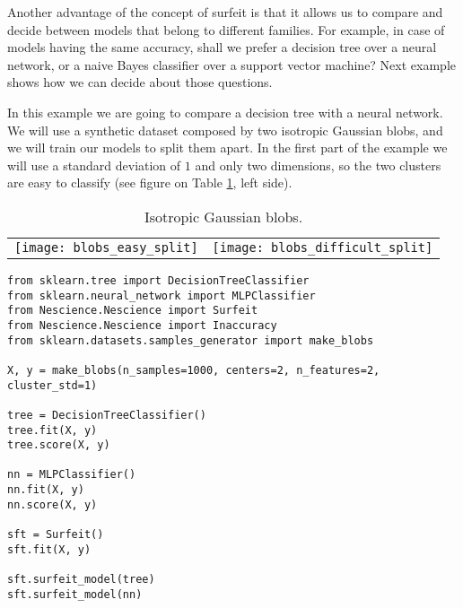 Another advantage of the concept of surfeit is that it allows us to compare and decide between models that belong to different families. For example, in case of models having the same accuracy, shall we prefer a decision tree over a neural network, or a naive Bayes classifier over a support vector machine? Next example shows how we can decide about those questions.

\begin{example}
\label{ex:dt_vs_nn}

In this example we are going to compare a decision tree with a neural network. We will use a synthetic dataset composed by two isotropic Gaussian blobs, and we will train our models to split them apart. In the first part of the example we will use a standard deviation of $1$ and only two dimensions, so the two clusters are easy to classify (see figure on Table \ref{tab:isotropic_gaussian_blobs}, left side).

\begin{table}
\begin{center}

\begin{tabular}{ c c }

\texttt{[image: blobs\_easy\_split]} & \texttt{[image: blobs\_difficult\_split]}

\end{tabular}
\end{center}
\caption{\label{tab:isotropic_gaussian_blobs}Isotropic Gaussian blobs.}
\end{table}


\begin{sourcecode}
{\scriptsize \begin{verbatim}
from sklearn.tree import DecisionTreeClassifier
from sklearn.neural_network import MLPClassifier
from Nescience.Nescience import Surfeit
from Nescience.Nescience import Inaccuracy
from sklearn.datasets.samples_generator import make_blobs

X, y = make_blobs(n_samples=1000, centers=2, n_features=2, cluster_std=1)

tree = DecisionTreeClassifier()
tree.fit(X, y)
tree.score(X, y)

nn = MLPClassifier()
nn.fit(X, y)
nn.score(X, y)

sft = Surfeit()
sft.fit(X, y)

sft.surfeit_model(tree)
sft.surfeit_model(nn)


\end{verbatim}}
\end{sourcecode}
\end{example}

